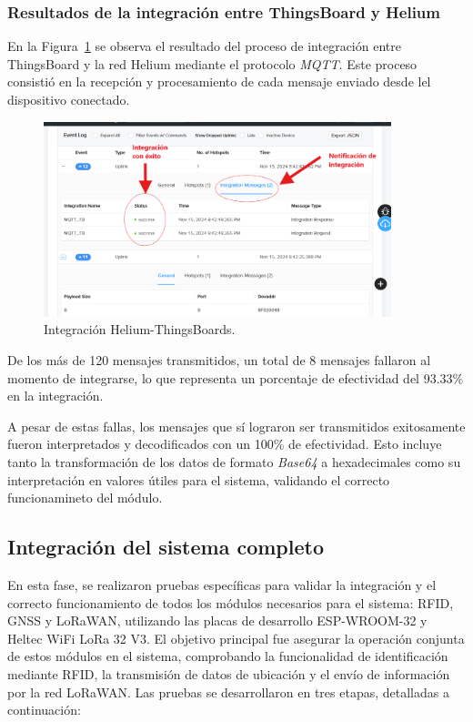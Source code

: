 \subsubsection{Resultados de la integración entre ThingsBoard y Helium }

En la Figura~\ref{fig:hel_tb} se observa el resultado del proceso de integración entre ThingsBoard y la red Helium mediante el protocolo \textit{MQTT}. Este proceso consistió en la recepción y procesamiento de cada mensaje enviado desde lel dispositivo conectado. 

\begin{figure}[H]
\leavevmode
\begin{minipage}{\textwidth}
\begin{center}
\includegraphics[width=0.9\textwidth]{./capitulo_05/imagen/resmon/integra2c.png}
\caption{Integración Helium-ThingsBoards.\label{fig:hel_tb}}
\end{center}
\end{minipage}
\end{figure}

De los más de 120 mensajes transmitidos, un total de 8 mensajes fallaron al momento de integrarse, lo que representa un porcentaje de efectividad del 93.33\% en la integración.

A pesar de estas fallas, los mensajes que sí lograron ser transmitidos exitosamente fueron interpretados y decodificados con un 100\% de efectividad. Esto incluye tanto la transformación de los datos de formato \textit{Base64} a hexadecimales como su interpretación en valores útiles para el sistema, validando el correcto funcionamineto del módulo.




\subsection{Integración del sistema completo}
En esta fase, se realizaron pruebas específicas para validar la integración y el correcto funcionamiento de todos los módulos necesarios para el sistema: RFID, GNSS y LoRaWAN, utilizando las placas de desarrollo ESP-WROOM-32 y Heltec WiFi LoRa 32 V3. El objetivo principal fue asegurar la operación conjunta de estos módulos en el sistema, comprobando la funcionalidad de identificación mediante RFID, la transmisión de datos de ubicación y el envío de información por la red LoRaWAN. Las pruebas se desarrollaron en tres etapas, detalladas a continuación:

